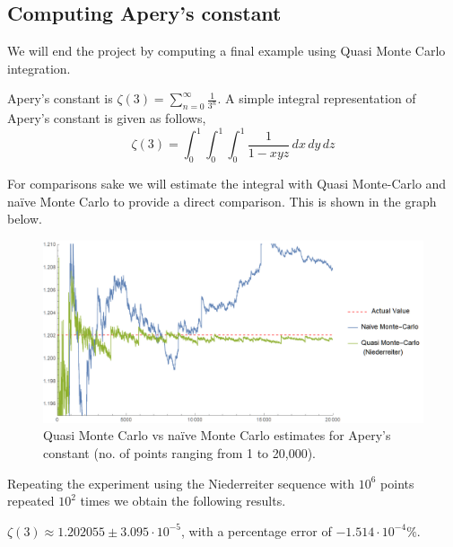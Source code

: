 \documentclass[12pt]{article}
\numberwithin{equation}{section}
\begin{document}
\subsection{Computing Apery's constant}
We will end the project by computing a final example using Quasi Monte Carlo integration.\par
Apery's constant is $\zeta(3)=\sum_{n=0}^{\infty}\frac{1}{3^n}$. A simple integral representation of Apery's constant is given as follows,
\[\zeta(3)=\int_0^1\int_0^1\int_0^1 \frac{1}{1-xyz}\, dx\, dy\, dz\]
\par For comparisons sake we will estimate the integral with Quasi Monte-Carlo and naïve Monte Carlo to provide a direct comparison. This is shown in the graph below.
\begin{figure}[!htb]
    \centering
    \includegraphics[width=\textwidth]{Images/aperyquasi.png}
    \caption{Quasi Monte Carlo vs naïve Monte Carlo estimates for Apery's constant (no. of points ranging from 1 to 20,000).}
    \label{fig:aperyquasi}
\end{figure}
\par Repeating the experiment using the Niederreiter sequence with $10^6$ points repeated $10^2$ times we obtain the following results.
\par $\zeta(3)\approx 1.202055 \pm 3.095 \cdot 10^{-5}$, with a percentage error of $-1.514 \cdot 10^{-4} \%.$
\FloatBarrier


\end{document}

